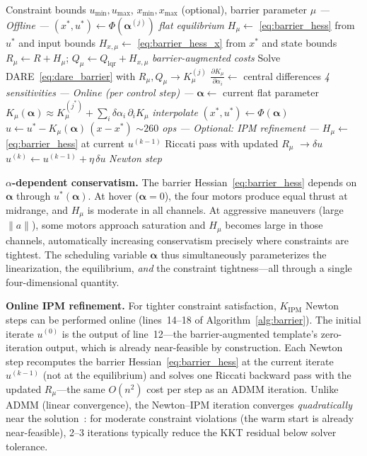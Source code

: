\documentclass[letterpaper, 10pt, conference]{IEEEtran}
\newcommand{\balpha}{\bm{\alpha}}
\begin{document}
\begin{algorithm}[t]
\caption{Barrier-Augmented Template MPC}
\label{alg:barrier}
\begin{algorithmic}[1]
\REQUIRE Constraint bounds $u_{\min}, u_{\max}$,
  $x_{\min}, x_{\max}$ (optional),
  barrier parameter $\mu$
\STATE \textit{--- Offline ---}
\FOR{each grid point $\balpha^{(j)}$}
  \STATE $(x^*, u^*) \gets \Phi(\balpha^{(j)})$
    \hfill\textit{flat equilibrium}
  \STATE $H_\mu \gets$ \eqref{eq:barrier_hess}
    from $u^*$ and input bounds
  \STATE $H_{x,\mu} \gets$ \eqref{eq:barrier_hess_x}
    from $x^*$ and state bounds
  \STATE $R_\mu \gets R + H_\mu$;
    $Q_\mu \gets Q_{\mathrm{lqr}} + H_{x,\mu}$
    \hfill\textit{barrier-augmented costs}
  \STATE Solve DARE~\eqref{eq:dare_barrier}
    with $R_\mu, Q_\mu \to K_\mu^{(j)}$
  \STATE $\frac{\partial K_\mu}{\partial \alpha_i}
    \gets$ central differences
    \hfill\textit{4 sensitivities}
\ENDFOR
\STATE \textit{--- Online (per control step) ---}
\STATE $\balpha \gets$ current flat parameter
\STATE $K_\mu(\balpha) \approx K_\mu^{(j^*)}
  + \sum_i \delta\alpha_i \,
  \partial_i K_\mu$
  \hfill\textit{interpolate}
\STATE $(x^*, u^*) \gets \Phi(\balpha)$
\STATE $u \gets u^* - K_\mu(\balpha) \, (x - x^*)$
  \hfill\textit{${\sim}260$ ops}
\STATE \textit{--- Optional: IPM refinement ---}
  \STATE $H_\mu \gets$ \eqref{eq:barrier_hess}
    at current $u^{(k-1)}$
  \STATE Riccati pass with updated $R_\mu$
    $\to \delta u$
  \STATE $u^{(k)} \gets u^{(k-1)} + \eta \, \delta u$
    \hfill\textit{Newton step}
\ENDFOR
\end{algorithmic}
\end{algorithm}

\textbf{$\alpha$-dependent conservatism.}
The barrier Hessian~\eqref{eq:barrier_hess} depends on
$\balpha$ through $u^*(\balpha)$.
At hover ($\balpha = 0$), the four motors produce equal
thrust at midrange, and $H_\mu$ is moderate in all channels.
At aggressive maneuvers (large $\|a\|$), some motors approach
saturation and $H_\mu$ becomes large in those channels,
automatically increasing conservatism precisely where
constraints are tightest.
The scheduling variable $\balpha$ thus simultaneously
parameterizes the linearization, the equilibrium,
\emph{and} the constraint tightness---all through a single
four-dimensional quantity.

\textbf{Online IPM refinement.}
For tighter constraint satisfaction, $K_{\mathrm{IPM}}$
Newton steps can be performed online
(lines~14--18 of Algorithm~\ref{alg:barrier}).
The initial iterate $u^{(0)}$ is the output of line~12---the
barrier-augmented template's zero-iteration output, which is
already near-feasible by construction.
Each Newton step recomputes the barrier
Hessian~\eqref{eq:barrier_hess} at the current iterate
$u^{(k-1)}$ (not at the equilibrium) and solves one Riccati
backward pass with the updated $R_\mu$---the same
$O(n^2)$ cost per step as an ADMM iteration.
Unlike ADMM (linear convergence), the Newton--IPM iteration
converges \emph{quadratically} near the
solution~\cite{boyd2004,jordana2023}: for moderate constraint
violations (the warm start is already near-feasible),
2--3 iterations typically reduce the KKT residual
below solver tolerance.
\end{document}

